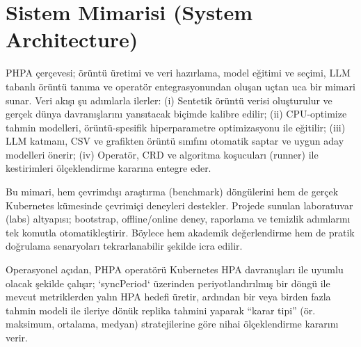 \section{Sistem Mimarisi (System Architecture)}

PHPA çerçevesi; örüntü üretimi ve veri hazırlama, model eğitimi ve seçimi, LLM tabanlı örüntü tanıma ve operatör entegrasyonundan oluşan uçtan uca bir mimari sunar. Veri akışı şu adımlarla ilerler: (i) Sentetik örüntü verisi oluşturulur ve gerçek dünya davranışlarını yansıtacak biçimde kalibre edilir; (ii) CPU-optimize tahmin modelleri, örüntü-spesifik hiperparametre optimizasyonu ile eğitilir; (iii) LLM katmanı, CSV ve grafikten örüntü sınıfını otomatik saptar ve uygun aday modelleri önerir; (iv) Operatör, CRD ve algoritma koşucuları (runner) ile kestirimleri ölçeklendirme kararına entegre eder.

Bu mimari, hem çevrimdışı araştırma (benchmark) döngülerini hem de gerçek Kubernetes kümesinde çevrimiçi deneyleri destekler. Projede sunulan laboratuvar (labs) altyapısı; bootstrap, offline/online deney, raporlama ve temizlik adımlarını tek komutla otomatikleştirir. Böylece hem akademik değerlendirme hem de pratik doğrulama senaryoları tekrarlanabilir şekilde icra edilir.

Operasyonel açıdan, PHPA operatörü Kubernetes HPA davranışları ile uyumlu olacak şekilde çalışır; `syncPeriod` üzerinden periyotlandırılmış bir döngü ile mevcut metriklerden yalın HPA hedefi üretir, ardından bir veya birden fazla tahmin modeli ile ileriye dönük replika tahmini yaparak “karar tipi” (ör. maksimum, ortalama, medyan) stratejilerine göre nihai ölçeklendirme kararını verir.

